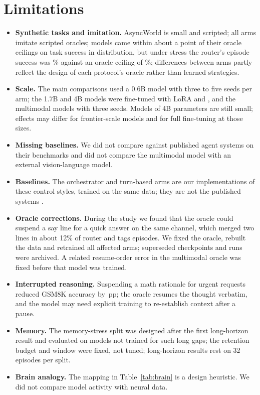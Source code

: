 \documentclass[10pt]{article}
\begin{document}
\section{Limitations}
\begin{itemize}\itemsep0pt
\item \textbf{Synthetic tasks and imitation.} AsyncWorld is small and scripted; all arms imitate scripted oracles; models came within about a point of their oracle ceilings on task success in distribution, but under stress the router's episode success was \routerstressepisode\% against an oracle ceiling of \oraclerouterstressepisode\%; differences between arms partly reflect the design of each protocol's oracle rather than learned strategies.
\item \textbf{Scale.} The main comparisons used a 0.6B model with three to five seeds per arm; the 1.7B and 4B models were fine-tuned with LoRA and \scaleseedsclause, and the multimodal models with three seeds. Models of 4B parameters are still small; effects may differ for frontier-scale models and for full fine-tuning at those sizes.
\item \textbf{Missing baselines.} We did not compare against published agent systems \citep{li2026never} on their benchmarks and did not compare the multimodal model with an external vision-language model.
\item \textbf{Baselines.} The orchestrator and turn-based arms are our implementations of these control styles, trained on the same data; they are not the published systems \citep{li2026never,yao2022react}.
\item \textbf{Oracle corrections.} During the study we found that the oracle could suspend a say line for a quick answer on the same channel, which merged two lines in about 12\% of router and tags episodes. We fixed the oracle, rebuilt the data and retrained all affected arms; superseded checkpoints and runs were archived. A related resume-order error in the multimodal oracle was fixed before that model was trained.
\item \textbf{Interrupted reasoning.} Suspending a math rationale for urgent requests reduced GSM8K accuracy by \gsmdiff\,pp; the oracle resumes the thought verbatim, and the model may need explicit training to re-establish context after a pause.
\item \textbf{Memory.} The memory-stress split was designed after the first long-horizon result and evaluated on models not trained for such long gaps; the retention budget and window were fixed, not tuned; long-horizon results rest on 32 episodes per split.
\item \textbf{Brain analogy.} The mapping in Table~\ref{tab:brain} is a design heuristic. We did not compare model activity with neural data.
\end{itemize}
\end{document}
